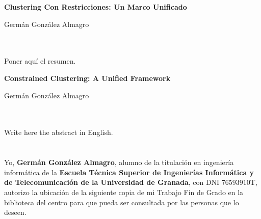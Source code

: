 

\cleardoublepage



\begin{center}
{\large\bfseries  Clustering Con Restricciones: Un Marco Unificado}\\
\end{center}
\begin{center}
Germán González Almagro\\
\end{center}

\\

\vspace{0.7cm}
\\

Poner aquí el resumen.
\cleardoublepage


\thispagestyle{empty}


\begin{center}
{\large\bfseries Constrained Clustering: A Unified Framework}\\
\end{center}
\begin{center}
Germán González Almagro\\
\end{center}

\vspace{0.7cm}
\\

\vspace{0.7cm}
\\

Write here the abstract in English.

\chapter*{}
\thispagestyle{empty}


Yo, \textbf{Germán González Almagro}, alumno de la titulación en ingeniería informática de la \textbf{Escuela Técnica Superior
de Ingenierías Informática y de Telecomunicación de la Universidad de Granada}, con DNI $\mathrm{76593910}$T, autorizo la
ubicación de la siguiente copia de mi Trabajo Fin de Grado en la biblioteca del centro para que pueda ser
consultada por las personas que lo deseen.

